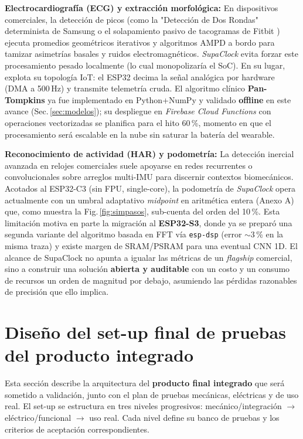 \documentclass[letterpaper,11pt]{article}
\newcommand{\rfigura}[1]{Fig.\,\ref{#1}}
\begin{document}
\textbf{Electrocardiografía (ECG) y extracción morfológica:}
En dispositivos comerciales, la detección de picos (como la "Detección de Dos Rondas" determinista de Samsung o el solapamiento pasivo de tacogramas de Fitbit \cite{fitbit_afib}) ejecuta promedios geométricos iterativos y algoritmos AMPD a bordo para tamizar asimetrías basales y ruidos electromagnéticos. \textit{SupaClock} evita forzar este procesamiento pesado localmente (lo cual monopolizaría el SoC). En su lugar, explota su topología IoT: el ESP32 decima la señal analógica por hardware (DMA a 500\,Hz) y transmite telemetría cruda. El algoritmo clínico \textbf{Pan-Tompkins} ya fue implementado en Python+NumPy y validado \textbf{offline} en este avance (Sec.\,\ref{sec:modelos}); su despliegue en \textit{Firebase Cloud Functions} con operaciones vectorizadas se planifica para el hito 60\,\%, momento en que el procesamiento será escalable en la nube sin saturar la batería del wearable.

\textbf{Reconocimiento de actividad (HAR) y podometría:}
La detección inercial avanzada en relojes comerciales suele apoyarse en redes recurrentes
o convolucionales sobre arreglos multi-IMU para discernir contextos biomecánicos. Acotados
al ESP32-C3 (sin FPU, single-core), la podometría de \textit{SupaClock} opera actualmente
con un umbral adaptativo \textit{midpoint} en aritmética entera (Anexo A) que, como muestra
la \rfigura{fig:simpasos}, sub-cuenta del orden del 10\,\%. Esta limitación motiva en parte
la migración al \textbf{ESP32-S3}, donde ya se preparó una segunda variante del algoritmo
basada en FFT vía \texttt{esp-dsp} (error $\sim$3\,\% en la misma traza) y existe margen
de SRAM/PSRAM para una eventual CNN 1D. El alcance de SupaClock no apunta a igualar las
métricas de un \textit{flagship} comercial, sino a construir una solución \textbf{abierta y
auditable} con un costo y un consumo de recursos un orden de magnitud por debajo, asumiendo
las pérdidas razonables de precisión que ello implica.

\section{Diseño del set-up final de pruebas del producto integrado}
\label{sec:setup}
Esta sección describe la arquitectura del \textbf{producto final integrado} que será sometido
a validación, junto con el plan de pruebas mecánicas, eléctricas y de uso real. El set-up se
estructura en tres niveles progresivos: mecánico/integración $\to$ eléctrico/funcional $\to$
uso real. Cada nivel define su banco de pruebas y los criterios de aceptación correspondientes.
\end{document}
